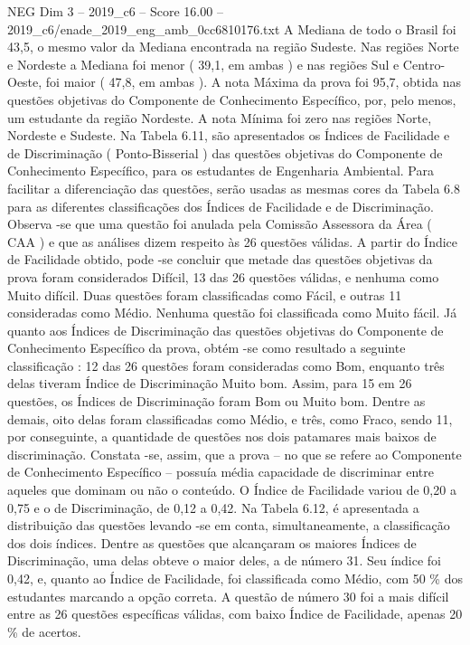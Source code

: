 \begin{textsample}{NEG Dim 3 – 2019\_c6 – Score 16.00 – 2019\_c6/enade\_2019\_eng\_amb\_0cc6810176.txt}
A Mediana de todo o Brasil foi 43,5, o mesmo valor da Mediana encontrada na região Sudeste.
Nas regiões Norte e Nordeste a Mediana foi menor ( 39,1, em ambas ) e nas regiões Sul e Centro-Oeste, foi maior ( 47,8, em ambas ).
A nota Máxima da prova foi 95,7, obtida nas questões objetivas do Componente de Conhecimento Específico, por, pelo menos, um estudante da região Nordeste.
A nota Mínima foi zero nas regiões Norte, Nordeste e Sudeste.
Na Tabela 6.11, são apresentados os Índices de Facilidade e de Discriminação ( Ponto-Bisserial ) das questões objetivas do Componente de Conhecimento Específico, para os estudantes de Engenharia Ambiental.
Para facilitar a diferenciação das questões, serão usadas as mesmas cores da Tabela 6.8 para as diferentes classificações dos Índices de Facilidade e de Discriminação.
Observa -se que uma questão foi anulada pela Comissão Assessora da Área ( CAA ) e que as análises dizem respeito às 26 questões válidas.
A partir do Índice de Facilidade obtido, pode -se concluir que metade das questões objetivas da prova foram considerados Difícil, 13 das 26 questões válidas, e nenhuma como Muito difícil.
Duas questões foram classificadas como Fácil, e outras 11 consideradas como Médio.
Nenhuma questão foi classificada como Muito fácil.
Já quanto aos Índices de Discriminação das questões objetivas do Componente de Conhecimento Específico da prova, obtém -se como resultado a seguinte classificação : 12 das 26 questões foram consideradas como Bom, enquanto três delas tiveram Índice de Discriminação Muito bom.
Assim, para 15 em 26 questões, os Índices de Discriminação foram Bom ou Muito bom.
Dentre as demais, oito delas foram classificadas como Médio, e três, como Fraco, sendo 11, por conseguinte, a quantidade de questões nos dois patamares mais baixos de discriminação.
Constata -se, assim, que a prova – no que se refere ao Componente de Conhecimento Específico – possuía média capacidade de discriminar entre aqueles que dominam ou não o conteúdo.
O Índice de Facilidade variou de 0,20 a 0,75 e o de Discriminação, de 0,12 a 0,42.
Na Tabela 6.12, é apresentada a distribuição das questões levando -se em conta, simultaneamente, a classificação dos dois índices.
Dentre as questões que alcançaram os maiores Índices de Discriminação, uma delas obteve o maior deles, a de número 31.
Seu índice foi 0,42, e, quanto ao Índice de Facilidade, foi classificada como Médio, com 50 \% dos estudantes marcando a opção correta.
A questão de número 30 foi a mais difícil entre as 26 questões específicas válidas, com baixo Índice de Facilidade, apenas 20 \% de acertos.

\end{textsample}
